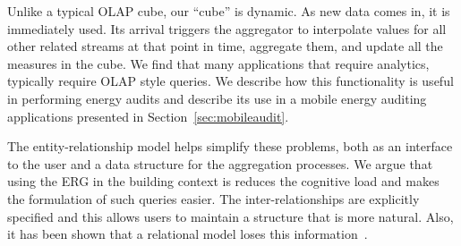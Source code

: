 Unlike a typical OLAP cube, our ``cube'' is dynamic.  As new data comes in, it is immediately used.  Its arrival triggers
the aggregator to interpolate values for all other related streams at that point in time, aggregate them, and update all
the measures in the cube.  We find that many applications that require analytics, typically require OLAP style queries.
We describe how this functionality is useful in performing energy audits and describe its use in
a mobile energy auditing applications presented in Section~\ref{sec:mobileaudit}.




The entity-relationship model helps simplify these problems, both as an interface to the user and a data structure for the aggregation processes.  
We argue that using the ERG in the building context is reduces the cognitive load and makes the formulation
of such queries easier.  The inter-relationships are explicitly specified and this allows users to 
maintain a structure that is more natural.  Also, it has been shown that a relational model loses this 
information~\cite{SenkoDB}.




